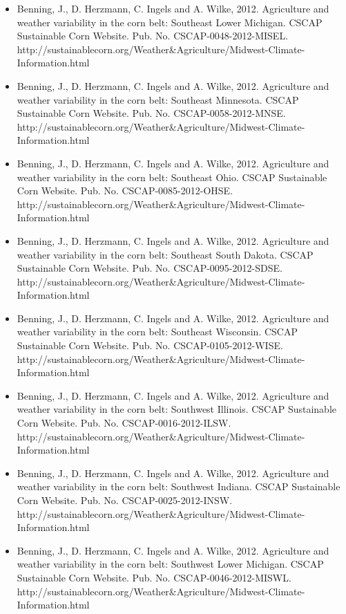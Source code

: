 \begin{itemize}
\item Benning, J., D. Herzmann, C. Ingels and A. Wilke, 2012. Agriculture and weather variability in the corn belt: Southeast Lower Michigan. CSCAP Sustainable Corn Website. Pub. No. CSCAP-0048-2012-MISEL. http://sustainablecorn.org/Weather\&Agriculture/Midwest-Climate-Information.html

\item Benning, J., D. Herzmann, C. Ingels and A. Wilke, 2012. Agriculture and weather variability in the corn belt: Southeast Minnesota. CSCAP Sustainable Corn Website. Pub. No. CSCAP-0058-2012-MNSE. http://sustainablecorn.org/Weather\&Agriculture/Midwest-Climate-Information.html

\item Benning, J., D. Herzmann, C. Ingels and A. Wilke, 2012. Agriculture and weather variability in the corn belt: Southeast Ohio. CSCAP Sustainable Corn Website. Pub. No. CSCAP-0085-2012-OHSE. http://sustainablecorn.org/Weather\&Agriculture/Midwest-Climate-Information.html

\item Benning, J., D. Herzmann, C. Ingels and A. Wilke, 2012. Agriculture and weather variability in the corn belt: Southeast South Dakota. CSCAP Sustainable Corn Website. Pub. No. CSCAP-0095-2012-SDSE. http://sustainablecorn.org/Weather\&Agriculture/Midwest-Climate-Information.html

\item Benning, J., D. Herzmann, C. Ingels and A. Wilke, 2012. Agriculture and weather variability in the corn belt: Southeast Wisconsin. CSCAP Sustainable Corn Website. Pub. No. CSCAP-0105-2012-WISE. http://sustainablecorn.org/Weather\&Agriculture/Midwest-Climate-Information.html

\item Benning, J., D. Herzmann, C. Ingels and A. Wilke, 2012. Agriculture and weather variability in the corn belt: Southwest Illinois. CSCAP Sustainable Corn Website. Pub. No. CSCAP-0016-2012-ILSW. http://sustainablecorn.org/Weather\&Agriculture/Midwest-Climate-Information.html

\item Benning, J., D. Herzmann, C. Ingels and A. Wilke, 2012. Agriculture and weather variability in the corn belt: Southwest Indiana. CSCAP Sustainable Corn Website. Pub. No. CSCAP-0025-2012-INSW. http://sustainablecorn.org/Weather\&Agriculture/Midwest-Climate-Information.html

\item Benning, J., D. Herzmann, C. Ingels and A. Wilke, 2012. Agriculture and weather variability in the corn belt: Southwest Lower Michigan. CSCAP Sustainable Corn Website. Pub. No. CSCAP-0046-2012-MISWL. http://sustainablecorn.org/Weather\&Agriculture/Midwest-Climate-Information.html


\end{itemize}
